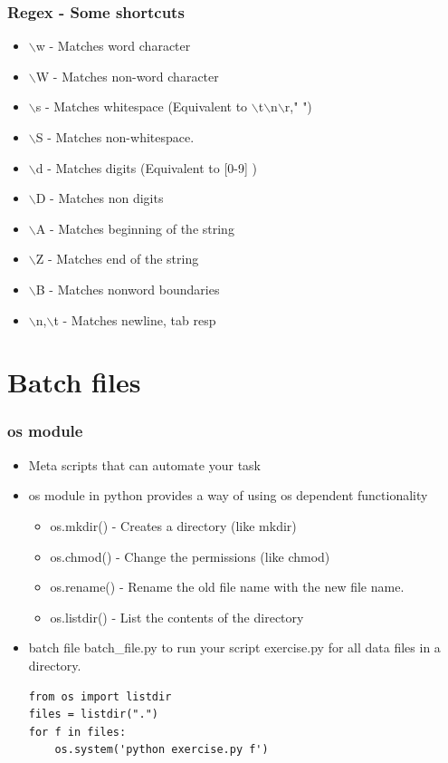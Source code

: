 \documentclass[xcolor=table]{beamer}
\begin{document}
\begin{frame}
\frametitle{Regex - Some shortcuts}
\begin{itemize}
\item $\backslash$w - Matches word character 
\item $\backslash$W - Matches non-word character
\item $\backslash$s - Matches whitespace (Equivalent to $\backslash$t$\backslash$n$\backslash$r," ")
\item $\backslash$S - Matches non-whitespace.
\item $\backslash$d - Matches digits (Equivalent to {[}0-9{]} )
\item $\backslash$D - Matches non digits
\item $\backslash$A - Matches beginning of the string
\item $\backslash$Z - Matches end of the string
\item $\backslash$B - Matches nonword boundaries
\item $\backslash$n,$\backslash$t - Matches newline, tab resp
\end{itemize}
\end{frame}



\section{Batch files}
\begin{frame}[fragile]
\frametitle{os module}
\begin{itemize}
\item Meta scripts that can automate your task
\item os module in python provides a way of using os dependent functionality
	\begin{itemize}
	\item os.mkdir() - Creates a directory (like mkdir)
	\item os.chmod() - Change the permissions (like chmod)
	\item os.rename() - Rename the old file name with the new file name.\	
	\item os.listdir() - List the contents of the directory\
	\end{itemize}
\item batch file batch\_file.py to run your script exercise.py for all data files in a directory.\\
\tiny
\begin{verbatim}
from os import listdir
files = listdir(".")
for f in files: 
	os.system('python exercise.py f')
\end{verbatim}
\end{itemize}
\end{frame}
\end{document}
